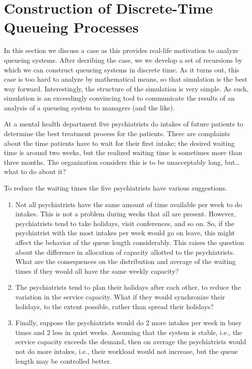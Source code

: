 \section{Construction of Discrete-Time Queueing
  Processes}
\label{sec:constr-discr-time}

In this section we discuss a case as this provides real-life
motivation to analyze queueing systems. After decribing the case, we
we develop a set of recursions by which we can construct queueing
systems in discrete time.  As it turns out, this case is too hard to
analyze by mathematical means, so that simulation is the best way
forward. Interestingly, the structure of the simulation is very
simple. As such, simulation is an exceedingly convincing tool to
communicate the results of an analysis of a queueing system to
managers (and the like). 

At a mental health department five psychiatrists do intakes of future
patients to determine the best treatment process for the patients.
There are complaints about the time patients have to wait for their
first intake; the desired waiting time is around two weeks, but the
realized waiting time is sometimes more than three months. The
organization considers this is to be unacceptably long, but\ldots what to do about it?

To reduce the waiting times the five psychiatrists have various
suggestions. 
\begin{enumerate}
\item Not all psychiatrists have the same amount of time available per
  week to do intakes. This is not a problem during weeks that all are
  present. However, psychiatrists tend to take holidays, visit
  conferences, and so on. So, if the psychiatrist with the most
  intakes per week would go on leave, this might affect the behavior
  of the queue length considerably. This raises the question about the difference
  in allocation of capacity allotted to the psychiatrists. What are
  the consequences on the distribution and average of the waiting
  times if they would all have the same weekly capacity?
\item The psychiatrists tend to plan their holidays after each
  other, to reduce the variation in the service capacity. What if they
  would synchronize their holidays, to the extent possible, rather
  than spread their holidays? 
\item Finally, suppose the psychiatrists would do 2 more intakes per
  week in busy times and 2 less in quiet weeks. Assuming that the
  system is stable, i.e., the service capacity exceeds the demand,
  then on average the psychiatrists would not do more intakes, i.e.,
  their workload would not increase, but the queue length may be
  controlled better.
\end{enumerate}


